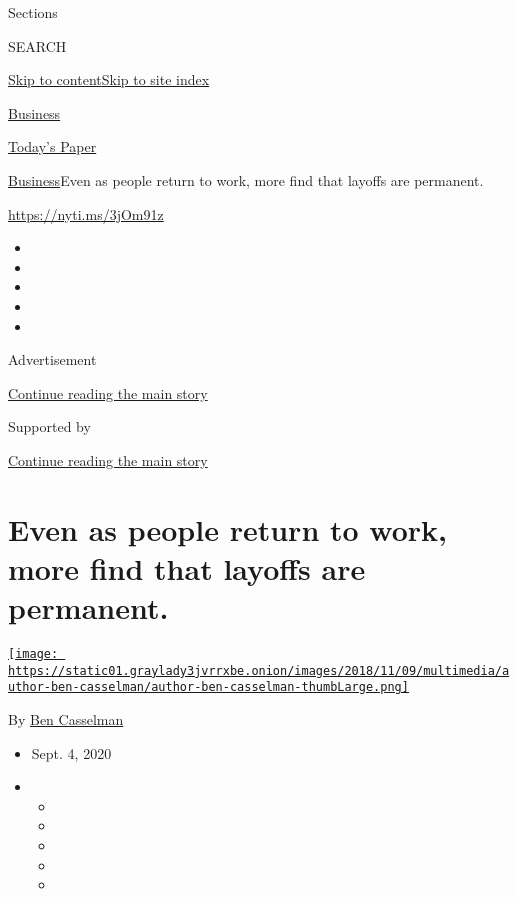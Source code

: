 Sections

SEARCH

\protect\hyperlink{site-content}{Skip to
content}\protect\hyperlink{site-index}{Skip to site index}

\href{https://www.nytimes3xbfgragh.onion/section/business}{Business}

\href{https://myaccount.nytimes3xbfgragh.onion/auth/login?response_type=cookie\&client_id=vi}{}

\href{https://www.nytimes3xbfgragh.onion/section/todayspaper}{Today's
Paper}

\href{/section/business}{Business}\textbar{}Even as people return to
work, more find that layoffs are permanent.

\url{https://nyti.ms/3jOm91z}

\begin{itemize}
\item
\item
\item
\item
\item
\end{itemize}

Advertisement

\protect\hyperlink{after-top}{Continue reading the main story}

Supported by

\protect\hyperlink{after-sponsor}{Continue reading the main story}

\hypertarget{even-as-people-return-to-work-more-find-that-layoffs-are-permanent}{%
\section{Even as people return to work, more find that layoffs are
permanent.}\label{even-as-people-return-to-work-more-find-that-layoffs-are-permanent}}

\href{https://www.nytimes3xbfgragh.onion/by/ben-casselman}{\texttt{[image: https://static01.graylady3jvrrxbe.onion/images/2018/11/09/multimedia/author-ben-casselman/author-ben-casselman-thumbLarge.png]}}

By \href{https://www.nytimes3xbfgragh.onion/by/ben-casselman}{Ben
Casselman}

\begin{itemize}
\item
  Sept. 4, 2020
\item
  \begin{itemize}
  \item
  \item
  \item
  \item
  \item
  \end{itemize}
\end{itemize}

